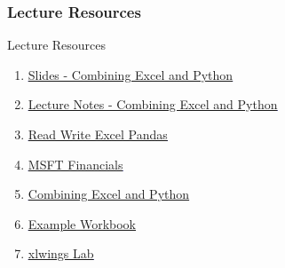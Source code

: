 \documentclass[handout, 11pt]{beamer}
\begin{document}
\begin{frame}
\frametitle{Lecture Resources}
{
\begin{block}{Lecture Resources}
\begin{enumerate}
\item \textcolor{blue}{\underline{\href{https://nickderobertis.github.io/fin-model-course/\_static/generated/pdfs/S9 Combining Excel and Python.pdf}{Slides - Combining Excel and Python}}}
\item \textcolor{blue}{\underline{\href{https://nickderobertis.github.io/fin-model-course/\_static/generated/pdfs/LN9 Combining Excel and Python.pdf}{Lecture Notes - Combining Excel and Python}}}
\item \textcolor{blue}{\underline{\href{https://nickderobertis.github.io/fin-model-course/\_static/Examples/Connecting Python and Excel/pandas/Read Write Excel Pandas.ipynb}{Read Write Excel Pandas}}}
\item \textcolor{blue}{\underline{\href{https://nickderobertis.github.io/fin-model-course/\_static/Materials for Lab Exercises/Connecting Python and Excel/pandas/MSFT Financials.xls}{MSFT Financials}}}
\item \textcolor{blue}{\underline{\href{https://nickderobertis.github.io/fin-model-course/\_static/Examples/Connecting Python and Excel/xlwings/Combining Excel and Python.ipynb}{Combining Excel and Python}}}
\item \textcolor{blue}{\underline{\href{https://nickderobertis.github.io/fin-model-course/\_static/Examples/Connecting Python and Excel/xlwings/Example Workbook.xlsx}{Example Workbook}}}
\item \textcolor{blue}{\underline{\href{https://nickderobertis.github.io/fin-model-course/\_static/Materials for Lab Exercises/Connecting Python and Excel/xlwings/xlwings Lab.xlsx}{xlwings Lab}}}
\end{enumerate}
\vfill
\end{block}
}
\label{frames:resources}
\end{frame}
\end{document}
